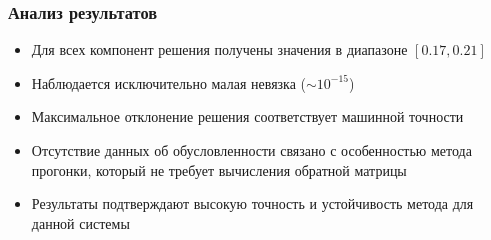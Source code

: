 \documentclass[12pt, a4paper]{article}
\begin{document}
\subsubsection*{Анализ результатов}
\begin{itemize}
\item Для всех компонент решения получены значения в диапазоне $[0.17, 0.21]$
\item Наблюдается исключительно малая невязка ($\sim 10^{-15}$)
\item Максимальное отклонение решения соответствует машинной точности
\item Отсутствие данных об обусловленности связано с особенностью метода прогонки, 
      который не требует вычисления обратной матрицы
\item Результаты подтверждают высокую точность и устойчивость метода для данной системы
\end{itemize}
\end{document}
